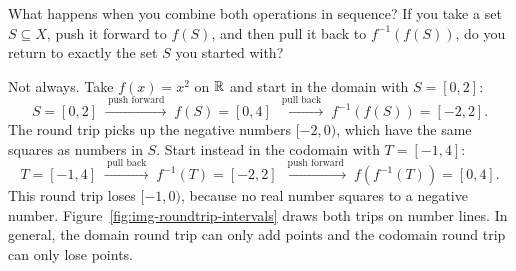 What happens when you combine both operations in sequence? If you take a set $S \subseteq X$, push it forward to $f(S)$, and then pull it back to $f^{-1}(f(S))$, do you return to exactly the set $S$ you started with? 

Not always. Take $f(x) = x^2$ on $\mathbb{R}$ and start in the domain with $S = [0, 2]$:
\[
S = [0, 2] \;\xrightarrow{\ \text{push forward}\ }\; f(S) = [0, 4] \;\xrightarrow{\ \text{pull back}\ }\; f^{-1}(f(S)) = [-2, 2].
\]
The round trip picks up the negative numbers $[-2, 0)$, which have the same squares as numbers in $S$. Start instead in the codomain with $T = [-1, 4]$:
\[
T = [-1, 4] \;\xrightarrow{\ \text{pull back}\ }\; f^{-1}(T) = [-2, 2] \;\xrightarrow{\ \text{push forward}\ }\; f(f^{-1}(T)) = [0, 4].
\]
This round trip loses $[-1, 0)$, because no real number squares to a negative number. Figure~\ref{fig:img-roundtrip-intervals} draws both trips on number lines. In general, the domain round trip can only add points and the codomain round trip can only lose points.

